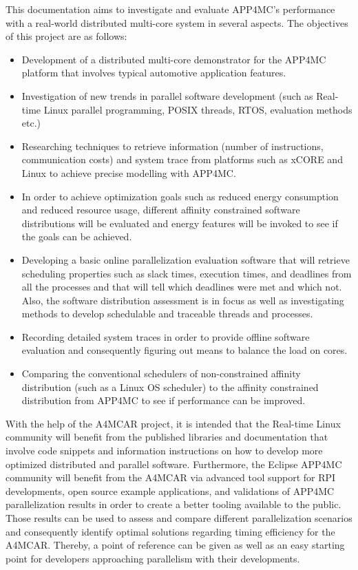 This documentation aims to investigate and evaluate APP4MC's performance with a real-world distributed multi-core system in several aspects. The objectives of this project are as follows:
\begin{itemize}
	\item Development of a distributed multi-core demonstrator for the APP4MC platform that involves typical automotive application features.
	\item Investigation of new trends in parallel software development (such as Real-time Linux parallel programming, POSIX threads, RTOS, evaluation methods etc.)
	\item Researching techniques to retrieve information (number of instructions, communication costs) and system trace from platforms such as xCORE and Linux to achieve precise modelling with APP4MC.
	\item In order to achieve optimization goals such as reduced energy consumption and reduced resource usage, different affinity constrained software distributions will be evaluated and energy features will be invoked to see if the goals can be achieved.
	\item Developing a basic online parallelization evaluation software that will retrieve scheduling properties such as slack times, execution times, and deadlines from all the processes and that will tell which deadlines were met and which not. Also, the software distribution assessment is in focus as well as investigating methods to develop schedulable and traceable threads and processes.
	\item Recording detailed system traces in order to provide offline software evaluation and consequently figuring out means to balance the load on cores.
	\item Comparing the conventional schedulers of non-constrained affinity distribution (such as a Linux OS scheduler) to the affinity constrained distribution from APP4MC to see if performance can be improved.
\end{itemize}

With the help of the A4MCAR project, it is intended that the Real-time Linux community will benefit from the published libraries and documentation that involve code snippets and information instructions on how to develop more optimized distributed and parallel software. Furthermore, the Eclipse APP4MC community will benefit from the A4MCAR via advanced tool support for RPI developments, open source example applications, and validations of APP4MC parallelization results in order to create a better tooling available to the public. Those results can be used to assess and compare different parallelization scenarios and consequently identify optimal solutions regarding timing efficiency for the A4MCAR. Thereby, a point of reference can be given as well as an easy starting point for developers approaching parallelism with their developments.

